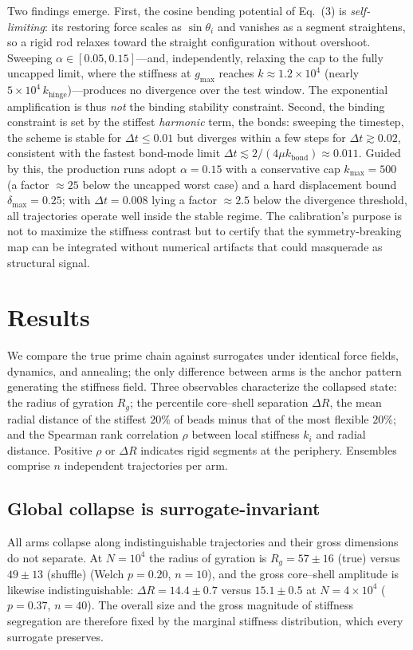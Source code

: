 \documentclass[11pt]{article}
\begin{document}
Two findings emerge. First, the cosine bending potential of Eq.~(3) is
\emph{self-limiting}: its restoring force scales as $\sin\theta_i$ and vanishes as a
segment straightens, so a rigid rod relaxes toward the straight configuration
without overshoot. Sweeping $\alpha \in [0.05, 0.15]$---and, independently, relaxing
the cap to the fully uncapped limit, where the stiffness at $g_{\max}$ reaches
$k \approx 1.2 \times 10^{4}$ (nearly $5 \times 10^{4}\,k_{\text{hinge}}$)---produces
no divergence over the test window. The exponential amplification is thus \emph{not}
the binding stability constraint. Second, the binding constraint is set by the
stiffest \emph{harmonic} term, the bonds: sweeping the timestep, the scheme is stable
for $\Delta t \le 0.01$ but diverges within a few steps for $\Delta t \gtrsim 0.02$,
consistent with the fastest bond-mode limit $\Delta t \lesssim 2/(4\mu k_{\text{bond}})
\approx 0.011$. Guided by this, the production runs adopt $\alpha = 0.15$ with a
conservative cap $k_{\max} = 500$ (a factor $\approx 25$ below the uncapped worst case)
and a hard displacement bound $\delta_{\max} = 0.25$; with $\Delta t = 0.008$ lying a
factor $\approx 2.5$ below the divergence threshold, all trajectories operate well
inside the stable regime. The calibration's purpose is not to maximize the stiffness
contrast but to certify that the symmetry-breaking map can be integrated without
numerical artifacts that could masquerade as structural signal.

\section{Results}

We compare the true prime chain against surrogates under identical force fields,
dynamics, and annealing; the only difference between arms is the anchor pattern
generating the stiffness field. Three observables characterize the collapsed state:
the radius of gyration $R_g$; the percentile core--shell separation $\Delta R$, the
mean radial distance of the stiffest $20\%$ of beads minus that of the most flexible
$20\%$; and the Spearman rank correlation $\rho$ between local stiffness $k_i$ and
radial distance. Positive $\rho$ or $\Delta R$ indicates rigid segments at the
periphery. Ensembles comprise $n$ independent trajectories per arm.

\subsection{Global collapse is surrogate-invariant}
All arms collapse along indistinguishable trajectories and their gross dimensions do
not separate. At $N = 10^4$ the radius of gyration is $R_g = 57 \pm 16$ (true) versus
$49 \pm 13$ (shuffle) (Welch $p = 0.20$, $n = 10$), and the gross core--shell
amplitude is likewise indistinguishable: $\Delta R = 14.4 \pm 0.7$ versus
$15.1 \pm 0.5$ at $N = 4\times10^4$ ($p = 0.37$, $n = 40$). The overall size and the
gross magnitude of stiffness segregation are therefore fixed by the marginal
stiffness distribution, which every surrogate preserves.
\end{document}
